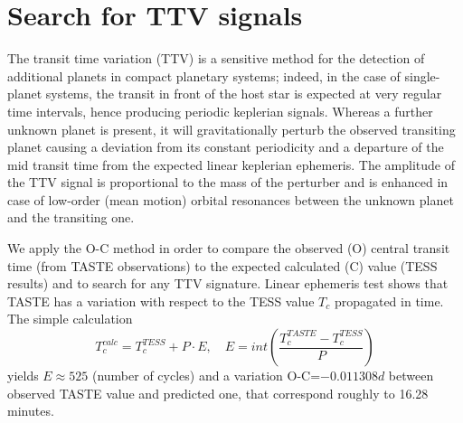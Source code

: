 \documentclass{aa}
\begin{document}
\section{Search for TTV signals}


The transit time variation (TTV) is a sensitive method for the detection of additional planets in compact planetary systems; indeed, in the case of  single-planet systems, the transit in front of the host star is expected at very regular time intervals, hence producing periodic keplerian signals.
Whereas a further unknown planet is present, it will gravitationally perturb the observed transiting planet causing a deviation from its constant periodicity and a departure of the mid transit time from the expected linear keplerian ephemeris.
The amplitude of the TTV signal is proportional to the mass of the perturber and is enhanced in case of low-order (mean motion) orbital resonances between the unknown planet and the transiting one.


We apply the O-C method in order to compare the observed (O) central transit time (from TASTE observations) to the expected calculated (C) value (TESS results) and to search for any TTV signature.
Linear ephemeris test shows that TASTE has a variation with 
respect to the TESS value $T_c$ propagated in time. The simple calculation 
$$T_c^{calc}=T_c^{TESS}+P\cdot E, \quad E=int\left(\frac{T_c^{TASTE}-T_c^{TESS}}{P}\right)$$
yields $E\approx 525$ (number of cycles) and a variation O-C=$-0.011308 d$ between observed TASTE value and predicted one, that correspond roughly to 16.28 minutes.
\end{document}
